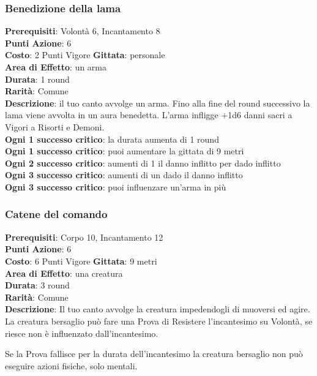 \documentclass[12pt,a4paper,twoside,openany]{book}
\begin{document}
\begin{multicols}{2}
\subsubsection*{Benedizione della lama}
\textbf{Prerequisiti}: Volontà 6, Incantamento 8\\
\textbf{Punti Azione}: 6\\
\textbf{Costo}: 2 Punti Vigore
\textbf{Gittata}: personale\\
\textbf{Area di Effetto}: un arma\\
\textbf{Durata}: 1 round\\
\textbf{Rarità}: Comune\\
\textbf{Descrizione}: il tuo canto avvolge un arma. Fino alla fine del round successivo la lama viene avvolta in un aura benedetta. L'arma infligge +1d6 danni sacri a Vigori a Risorti e Demoni.\\
\textbf{Ogni 1 successo critico}: la durata aumenta di 1 round\\
\textbf{Ogni 1 successo critico}: puoi aumentare la gittata di 9 metri\\
\textbf{Ogni 2 successo critico}: aumenti di 1 il danno inflitto per dado inflitto\\
\textbf{Ogni 3 successo critico}: aumenti di un dado il danno inflitto\\
\textbf{Ogni 3 successo critico}: puoi influenzare un'arma in più

\subsubsection*{Catene del comando} %
\textbf{Prerequisiti}: Corpo 10, Incantamento 12\\
\textbf{Punti Azione}: 6\\
\textbf{Costo}: 6 Punti Vigore
\textbf{Gittata}: 9 metri\\
\textbf{Area di Effetto}: una creatura\\
\textbf{Durata}: 3 round\\
\textbf{Rarità}: Comune\\
\textbf{Descrizione}: Il tuo canto avvolge la creatura impedendogli di muoversi ed agire. La creatura bersaglio può fare una Prova di Resistere l'incantesimo su Volontà, se riesce non è influenzato dall'incantesimo.

Se la Prova fallisce per la durata dell'incantesimo la creatura bersaglio non può eseguire azioni fisiche, solo mentali. 


\end{multicols}
\end{document}
